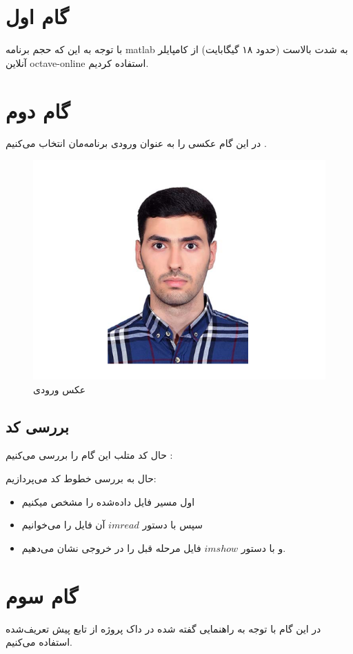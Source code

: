 
\def \Subject {سیگنال تصویر و اضافه کردن نویز}
\def \Author {محمدحسین حسنی - ملیکا محمدی فخار}

\section{گام اول}
با توجه به این که حجم برنامه matlab به شدت بالاست (حدود ۱۸ گیگابایت) از کامپایلر آنلاین octave-online استفاده کردیم.
\section{گام دوم}
در این گام عکسی را به عنوان ورودی برنامه‌مان انتخاب می‌کنیم
.
\begin{figure}[H]
    \centering
    \includegraphics[width=0.65\linewidth]{images/first.png}
    \caption{عکس ورودی}
    \label{fig:h}
\end{figure}
\subsection{بررسی کد}
حال کد متلب این گام را بررسی می‌کنیم
:

\lr{}

حال به بررسی خطوط کد می‌پردازیم:
\begin{itemize}
    \item اول مسیر فایل داده‌شده را مشخص میکنیم
    \item سپس با دستور 
    \(imread\)
     آن فایل را می‌خوانیم
    \item
    و با دستور
    \(imshow\)
    فایل مرحله قبل را در خروجی نشان می‌دهیم.
\end{itemize}

\section{گام سوم}
در این گام با توجه به راهنمایی گفته شده در داک پروژه از تابع پیش تعریف‌شده 
استفاده می‌کنیم.
\\
\\
